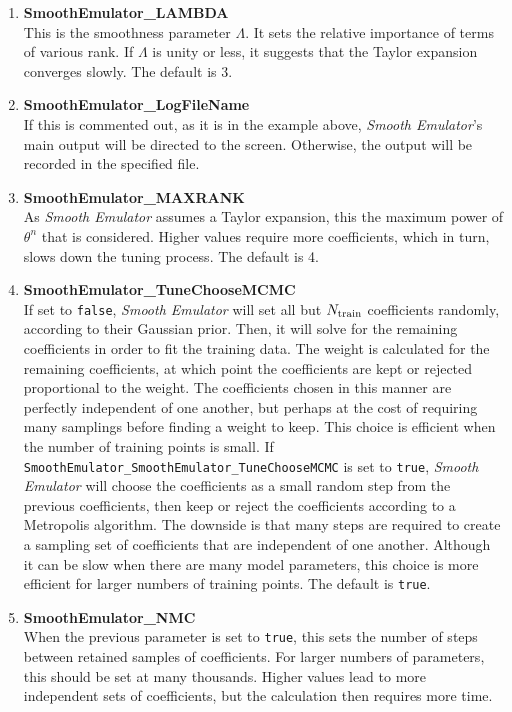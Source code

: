 \documentclass[UserManual.tex]{subfiles}
\begin{document}
\begin{enumerate}\itemsep 0pt
\item {\bf SmoothEmulator\_LAMBDA}\\
This is the smoothness parameter $\Lambda$. It sets the relative importance of terms of various rank. If $\Lambda$ is unity or less, it suggests that the Taylor expansion converges slowly. The default is 3.

\item {\bf SmoothEmulator\_LogFileName}\\
If this is commented out, as it is in the example above, {\it Smooth Emulator}'s main output will be directed to the screen. Otherwise, the output will be recorded in the specified file.
\item {\bf SmoothEmulator\_MAXRANK}\\
As {\it Smooth Emulator} assumes a Taylor expansion, this the maximum power of $\theta^n$ that is considered. Higher values require more coefficients, which in turn, slows down the tuning process. The default is 4.
\item {\bf SmoothEmulator\_TuneChooseMCMC}\\
If set to {\tt false}, {\it Smooth Emulator} will set all but $N_{\rm train}$ coefficients randomly, according to their Gaussian prior. Then, it will solve for the remaining coefficients in order to fit the training data. The weight is calculated for the remaining coefficients, at which point the coefficients are kept or rejected proportional to the weight. The coefficients chosen in this manner are perfectly independent of one another, but perhaps at the cost of requiring many samplings before finding a weight to keep. This choice is efficient when the number of training points is small. If {\tt SmoothEmulator\_SmoothEmulator\_TuneChooseMCMC} is set to {\tt true}, {\it Smooth Emulator} will choose the coefficients as a small random step from the previous coefficients, then keep or reject the coefficients according to a Metropolis algorithm. The downside is that many steps are required to create a sampling set of coefficients that are independent of one another. Although it can be slow when there are many model parameters, this choice is more efficient for larger numbers of training points.  The default is {\tt true}.
\item {\bf SmoothEmulator\_NMC}\\
When the previous parameter is set to {\tt true}, this sets the number of steps between retained samples of coefficients. For larger numbers of parameters, this should be set at many thousands. Higher values lead to more independent sets of coefficients, but the calculation then requires more time. 

\end{enumerate}
\end{document}
